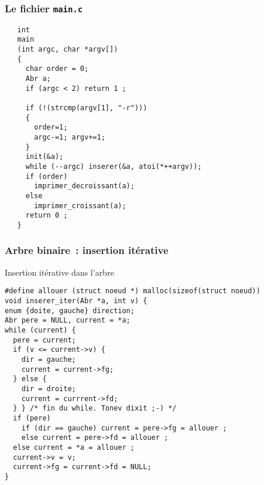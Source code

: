 \begin{frame}[fragile]
\frametitle{Le fichier \texttt{main.c}}%
\begin{verbatim}
   int 
   main
   (int argc, char *argv[]) 
   {
     char order = 0;
     Abr a;
     if (argc < 2) return 1 ;

     if (!(strcmp(argv[1], "-r"))) 
     {
       order=1;
       argc-=1; argv+=1;
     }
     init(&a);
     while (--argc) inserer(&a, atoi(*++argv));
     if (order)
       imprimer_decroissant(a);
     else
       imprimer_croissant(a);
     return 0 ;
   }
\end{verbatim}
\end{frame}
\begin{frame}[fragile]
    \frametitle{Arbre binaire~: insertion it\'erative}%
 Insertion it\'erative dans l'arbre
\begin{verbatim}
#define allouer (struct noeud *) malloc(sizeof(struct noeud))
void inserer_iter(Abr *a, int v) {
enum {doite, gauche} direction;
Abr pere = NULL, current = *a;
while (current) {
  pere = current;
  if (v <= current->v) {
    dir = gauche;
    current = current->fg;
  } else {
    dir = droite;
    current = currrent->fd;
  } } /* fin du while. Tonev dixit ;-) */
  if (pere) 
    if (dir == gauche) current = pere->fg = allouer ;
    else current = pere->fd = allouer ;
  else current = *a = allouer ;
  current->v = v;
  current->fg = current->fd = NULL;
}
\end{verbatim}
\end{frame}

